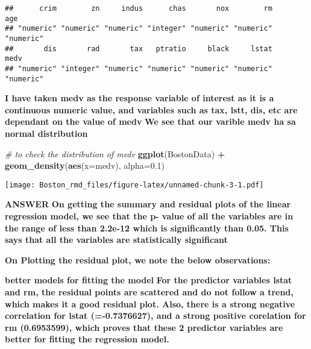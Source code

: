 \documentclass[]{article}
\newenvironment{Shaded}{\begin{snugshade}}{\end{snugshade}}
\newcommand{\CommentTok}[1]{\textcolor[rgb]{0.56,0.35,0.01}{\textit{#1}}}
\newcommand{\DataTypeTok}[1]{\textcolor[rgb]{0.13,0.29,0.53}{#1}}
\newcommand{\FloatTok}[1]{\textcolor[rgb]{0.00,0.00,0.81}{#1}}
\newcommand{\KeywordTok}[1]{\textcolor[rgb]{0.13,0.29,0.53}{\textbf{#1}}}
\newcommand{\NormalTok}[1]{#1}
\newcommand{\OperatorTok}[1]{\textcolor[rgb]{0.81,0.36,0.00}{\textbf{#1}}}
\newcommand{\StringTok}[1]{\textcolor[rgb]{0.31,0.60,0.02}{#1}}
\begin{document}
\begin{verbatim}
##      crim        zn     indus      chas       nox        rm       age 
## "numeric" "numeric" "numeric" "integer" "numeric" "numeric" "numeric" 
##       dis       rad       tax   ptratio     black     lstat      medv 
## "numeric" "integer" "numeric" "numeric" "numeric" "numeric" "numeric"
\end{verbatim}

\begin{Shaded}
\end{Shaded}

\textbf{I have taken medv as the response variable of interest as it is
a continuous numeric value, and variables such as tax, lstt, dis, etc
are dependant on the value of medv} \textbf{We see that our varible medv
ha sa normal distribution}

\begin{Shaded}
\begin{Highlighting}[]
\CommentTok{# to check the distribution of medv}
\KeywordTok{ggplot}\NormalTok{(BostonData) }\OperatorTok{+}
\StringTok{  }\KeywordTok{geom_density}\NormalTok{(}\KeywordTok{aes}\NormalTok{(}\DataTypeTok{x=}\NormalTok{medv), }\DataTypeTok{alpha=}\FloatTok{0.1}\NormalTok{)}
\end{Highlighting}
\end{Shaded}

\texttt{[image: Boston\_rmd\_files/figure-latex/unnamed-chunk-3-1.pdf]}

\textbf{ANSWER} \textbf{On getting the summary and residual plots of the
linear regression model, we see that the p- value of all the variables
are in the range of less than 2.2e-12 which is significantly than 0.05.
This says that all the variables are statistically significant}

\textbf{On Plotting the residual plot, we note the below observations:}

\textbf{better models for fitting the model} \textbf{For the predictor
variables lstat and rm, the residual points are scattered and do not
follow a trend, which makes it a good residual plot. Also, there is a
strong negative correlation for lstat (=-0.7376627), and a strong
positive corelation for rm (0.6953599), which proves that these 2
predictor variables are better for fitting the regression model.}
\end{document}
